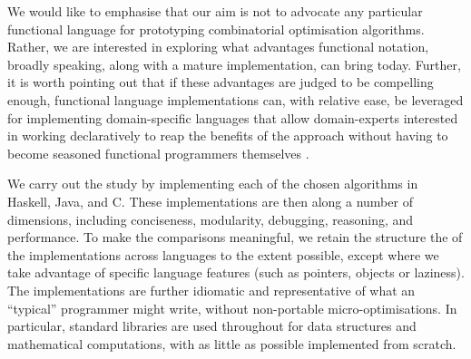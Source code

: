 We would like to emphasise that our aim is not to advocate any particular
functional language for prototyping combinatorial optimisation algorithms.
Rather, we are interested in exploring what advantages functional notation,
broadly speaking, along with a mature implementation, can bring today.
Further, it is worth pointing out that if these advantages are judged
to be compelling enough, functional language implementations can,
with relative ease, be leveraged for implementing domain-specific languages
that allow domain-experts interested in working declaratively to reap
the benefits of the approach without having to become seasoned functional
programmers themselves \cite{Hudak1998}.

We carry out the study by implementing each of the chosen algorithms in
Haskell, Java, and C. These implementations are then along a number of
dimensions, including conciseness, modularity, debugging, reasoning, and
performance. To make the comparisons meaningful, we retain the structure the
of the implementations across languages to the extent possible, except where
we take advantage of specific language features (such as pointers, objects or
laziness). The implementations are further idiomatic and representative of
what an ``typical'' programmer might write, without non-portable
micro-optimisations. In particular, standard libraries are used throughout for
data structures and mathematical computations, with as little as possible
implemented from scratch.

